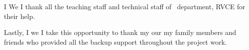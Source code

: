 \ifIDP \else\ifPG I \else\ifStuNameBUsed We \else I \fi\fi thank all the teaching staff and technical staff of \ifIDP \printGuideDeptAInLF\else\printDepartmentLF\fi\, department, RVCE for their help.\\ \par \fi

Lastly, \ifPG I \else\ifStuNameBUsed we \else I \fi\fi take this opportunity to thank \ifPG my \else\ifStuNameBUsed our \else my \fi\fi family members and friends who provided all the backup support throughout the project work.\\ \par